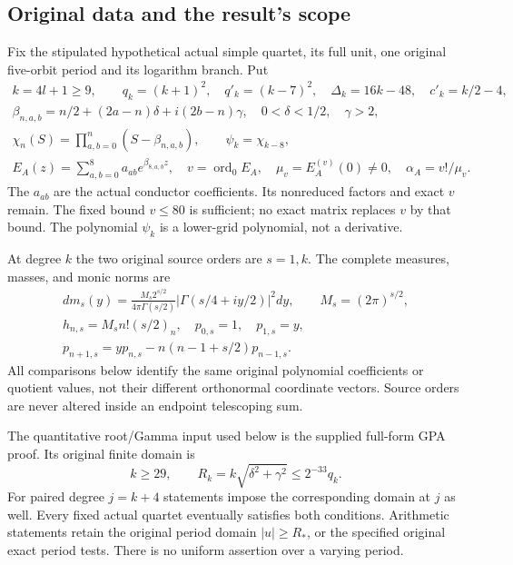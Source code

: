 \documentclass[11pt,a4paper]{article}
\begin{document}
\subsection{Original data and the result's scope}
Fix the stipulated hypothetical actual simple quartet, its full unit, one original five-orbit period and its logarithm branch. Put
\begin{equation}
\begin{gathered}
 k=4l+1\ge9,\qquad q_k=(k+1)^2,\quad q'_k=(k-7)^2,\quad
 \Delta_k=16k-48,\quad c'_k=k/2-4,\\
 \beta_{n,a,b}=n/2+(2a-n)\delta+i(2b-n)\gamma,
 \quad0<\delta<1/2,\quad\gamma>2,\\
 \chi_n(S)=\prod_{a,b=0}^n(S-\beta_{n,a,b}),\qquad \psi_k=\chi_{k-8},\\
 E_A(z)=\sum_{a,b=0}^8a_{ab}e^{\beta_{8,a,b}z},\quad
 v=\operatorname{ord}_0E_A,\quad \mu_v=E_A^{(v)}(0)\ne0,\quad
 \alpha_A=v!/\mu_v .
\end{gathered}\label{QOT:eq:data}
\tag{QOT1}
\end{equation}
The $a_{ab}$ are the actual conductor coefficients. Its nonreduced factors and exact $v$ remain. The fixed bound $v\le80$ is sufficient; no exact matrix replaces $v$ by that bound. The polynomial $\psi_k$ is a lower-grid polynomial, not a derivative.

At degree $k$ the two original source orders are $s=1,k$. The complete measures, masses, and monic norms are
\begin{equation}
\begin{gathered}
 dm_s(y)=\frac{M_s2^{s/2}}{4\pi\Gamma(s/2)}
     |\Gamma(s/4+iy/2)|^2dy,\qquad M_s=(2\pi)^{s/2},\\
 h_{n,s}=M_sn!(s/2)_n,\quad p_{0,s}=1,\quad p_{1,s}=y,\\
 p_{n+1,s}=yp_{n,s}-n(n-1+s/2)p_{n-1,s}.
\end{gathered}\label{QOT:eq:measure}
\tag{QOT2}
\end{equation}
All comparisons below identify the same original polynomial coefficients or quotient values, not their different orthonormal coordinate vectors. Source orders are never altered inside an endpoint telescoping sum.

The quantitative root/Gamma input used below is the supplied full-form GPA proof. Its original finite domain is
\begin{equation}
 k\ge29,\qquad R_k=k\sqrt{\delta^2+\gamma^2}\le2^{-33}q_k .
 \label{QOT:eq:domain}
\tag{QOT3}
\end{equation}
For paired degree $j=k+4$ statements impose the corresponding domain at $j$ as well. Every fixed actual quartet eventually satisfies both conditions. Arithmetic statements retain the original period domain $|u|\ge R_*$, or the specified original exact period tests. There is no uniform assertion over a varying period.
\end{document}
